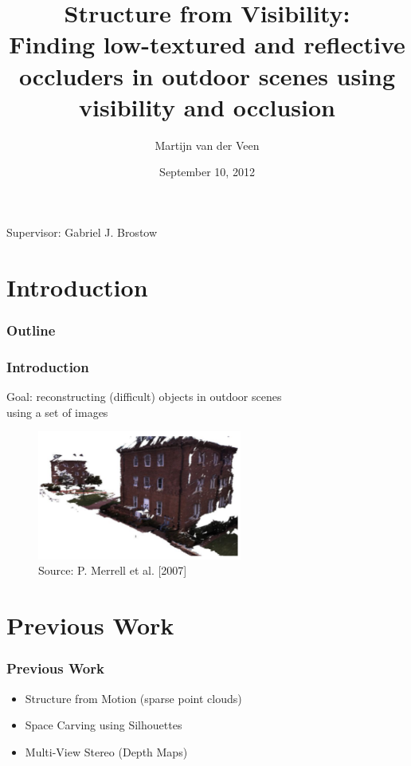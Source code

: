 \documentclass{beamer}
\title{Structure from Visibility: \\
       Finding low-textured and reflective occluders in outdoor scenes
       using visibility and occlusion}
\author[Martijn van der Veen]{Martijn van der Veen}
\date[10-09-2012]{September 10, 2012}
\begin{document}
\begin{frame}
  \titlepage
  \begin{center}
    Supervisor: Gabriel J. Brostow
  \end{center}
\end{frame}

\section{Introduction}

\begin{frame}
  \frametitle{Outline}
  \setcounter{tocdepth}{1}
  \tableofcontents %
\end{frame}

\begin{frame}
  \frametitle{Introduction}
  Goal: reconstructing (difficult) objects in outdoor scenes \\ using a set of images
  \begin{figure}[htb!]
   \centering
   \includegraphics[width=0.6\textwidth]{img/3dmodel}
   \caption*{\tiny Source: P. Merrell et al. [2007]} %
   \label{fig:3dmodel}
  \end{figure}
\end{frame}


\section{Previous Work}

\begin{frame}
  \frametitle{Previous Work}
  \begin{itemize}
    \item Structure from Motion (sparse point clouds)
    \item Space Carving using Silhouettes
    \item Multi-View Stereo (Depth Maps)   %
  \end{itemize}
\end{frame}
\end{document}
